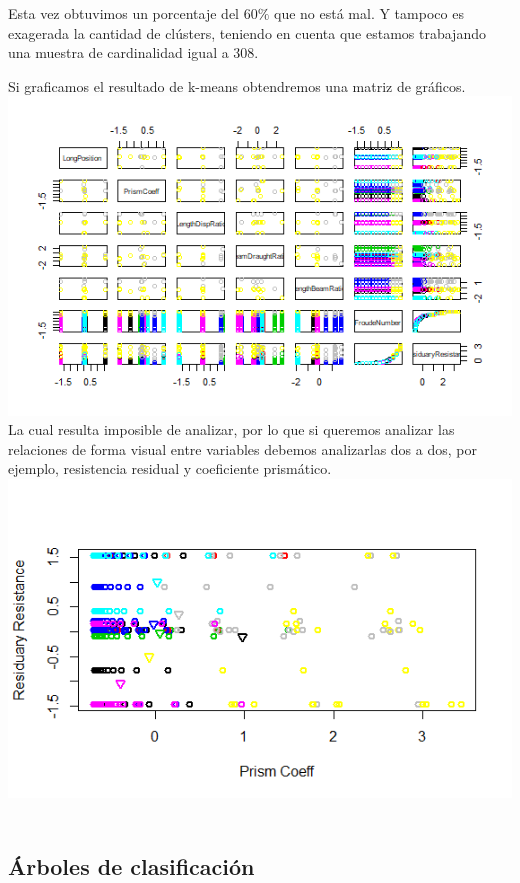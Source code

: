 \documentclass[twoside]{article}
\begin{document}
\begin{multicols}{2}
Esta vez obtuvimos un porcentaje del $60\%$ que no est\'a mal. Y tampoco es exagerada la cantidad de cl\'usters, teniendo en cuenta que estamos trabajando una muestra de cardinalidad igual a $308$.

Si graficamos el resultado de k-means obtendremos una matriz de gr\'aficos.\\

\includegraphics[scale=0.5]{images/pic_34.png} \\

La cual resulta imposible de analizar, por lo que si queremos analizar las relaciones de forma visual entre variables debemos analizarlas dos a dos, por ejemplo, resistencia residual y coeficiente prism\'atico.\\

\includegraphics[scale=0.5]{images/pic_35.png} \\\\


\subsection{\'Arboles de clasificaci\'on}


\end{multicols}
\end{document}
